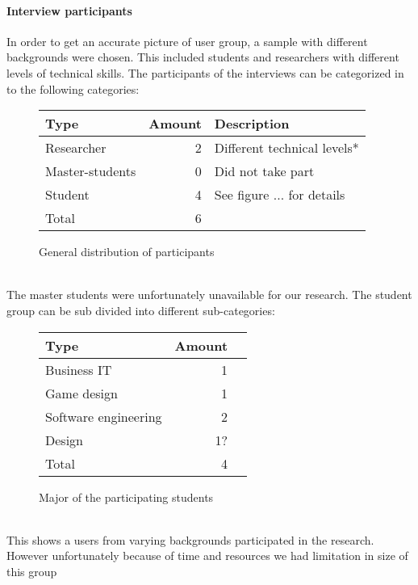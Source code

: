 \documentclass[conference]{IEEEtran}
\begin{document}
	\paragraph{Interview participants}
		In order to get an accurate picture of user group, a sample with different backgrounds were chosen. This included students and researchers with different levels of technical skills. The participants of the interviews can be categorized in to the following categories:
		\begin{figure}[ht]
			\centering
			\begin{tabular}{ | l | r | l | }
				\hline
				Type			& Amount	& Description \\ \hline \hline
				Researcher		& 2			& Different technical levels* \\ \hline
				Master-students	& 0			& Did not take part \\ \hline \hline
				Student			& 4			& See figure ... for details \\ \hline \hline
				Total			& 6			& \\ \hline
			\end{tabular}
			\caption{General distribution of participants}
		\end{figure}\\
		The master students were unfortunately unavailable for our research. The student group can be sub divided into different sub-categories:
		\begin{figure}[ht]
			\centering
			\begin{tabular}{ | l | r | l | }
				\hline
				Type					& Amount \\ \hline \hline
				Business IT				& 1 \\ \hline
				Game design				& 1 \\ \hline
				Software engineering	& 2 \\ \hline
				Design					& 1? \\ \hline \hline
				Total					& 4 \\ \hline
			\end{tabular}
			\caption{Major of the participating students}
		\end{figure} \\
		This shows a users from varying backgrounds participated in the research. However unfortunately because of time and resources we had limitation in size of this group
\end{document}
